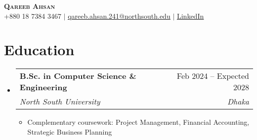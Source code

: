 \documentclass[letterpaper,11pt]{article}
\makeatletter
\newcommand{\resumeItem}[1]{
  \item\small{
    {#1 \vspace{-2pt}}
  }
}
\newcommand{\resumeSubheading}[4]{
  \vspace{-2pt}\item
    \begin{tabular*}{0.97\textwidth}[t]{l@{\extracolsep{\fill}}r}
      \textbf{#1} & #2 \\
      \textit{\small#3} & \textit{\small #4} \\
    \end{tabular*}\vspace{-7pt}
}
\newcommand{\resumeSubHeadingListStart}{\begin{itemize}[leftmargin=0.15in, label={}]}
\newcommand{\resumeSubHeadingListEnd}{\end{itemize}}
\newcommand{\resumeItemListStart}{\begin{itemize}}
\newcommand{\resumeItemListEnd}{\end{itemize}\vspace{-5pt}}
\makeatother
\begin{document}
\begin{center}
    \textbf{\Huge \scshape Qareeb Ahsan} \\ \vspace{1pt}
    \small +880 18 7384 3467 $|$ \href{mailto:qareeb.ahsan.241@northsouth.edu}{\underline{qareeb.ahsan.241@northsouth.edu}} $|$ \href{https://linkedin.com/in/qareebahsan}{\underline{LinkedIn}}
\end{center}

\section{Education}
  \resumeSubHeadingListStart
    \resumeSubheading
      {B.Sc. in Computer Science \& Engineering}{Feb 2024 -- Expected 2028}
      {North South University}{Dhaka}
      \resumeItemListStart
        \resumeItem{Complementary coursework: Project Management, Financial Accounting, Strategic Business Planning}
      \resumeItemListEnd
  \resumeSubHeadingListEnd

\end{document}
